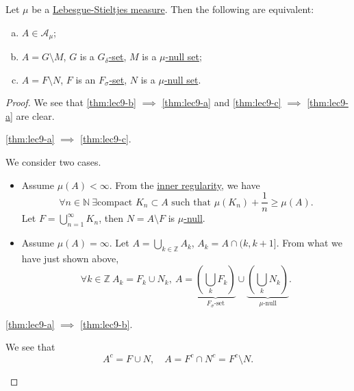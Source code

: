 \begin{theorem}\label{thm:lec9}
	Let \(\mu \) be a \hyperref[def:Lebesgue-Stieltjes-measure]{Lebesgue-Stieltjes measure}. Then the following are equivalent:
	\begin{enumerate}[(a)]
		\item\label{thm:lec9-a} \(A\in \mathcal{A} _\mu \);
		\item\label{thm:lec9-b} \(A = G\setminus M\), \(G\) is a \hyperref[def:G-delta-set]{\(G_{\delta}\)-set}, \(M\) is a \hyperref[def:mu-null-set]{\(\mu\)-null set};
		\item\label{thm:lec9-c} \(A = F\setminus N\), \(F\) is an \hyperref[def:F-sigma-set]{\(F_{\sigma}\)-set}, \(N\) is a \hyperref[def:mu-null-set]{\(\mu\)-null set}.
	\end{enumerate}
\end{theorem}
\begin{proof}
	We see that \autoref{thm:lec9-b} \(\implies \) \autoref{thm:lec9-a} and \autoref{thm:lec9-c} \(\implies \) \autoref{thm:lec9-a} are clear.
	\begin{claim}
		\autoref{thm:lec9-a} \(\implies \) \autoref{thm:lec9-c}.
	\end{claim}
	\begin{explanation}
		We consider two cases.
		\begin{itemize}
			\item Assume \(\mu (A)<\infty \). From the \hyperref[thm:inner-regularity]{inner regularity}, we have
			      \[
				      \forall n\in\mathbb{N} \ \exists \text{compact }K_{n}\subset A\text{ such that } \mu (K_{n}) + \frac{1}{n} \geq \mu (A).
			      \]
			      Let \(F = \bigcup_{n=1}^{\infty} K_{n}\), then \(N = A\setminus F\) is \hyperref[def:mu-null-set]{\(\mu\)-null}.
			\item Assume \(\mu (A) = \infty \). Let \(A = \bigcup_{k\in\mathbb{Z} } A_{k}\), \(A_{k} = A\cap (k, k+1]\). From what we
			      have just shown above,
			      \[
				      \forall k\in\mathbb{Z}\ A_{k} = F_{k}\cup N_{k},\ A = \underbrace{\left(\bigcup_{k}F_{k} \right)}_{\hyperref[def:F-sigma-set]{F_{\sigma}\text{-set}}}\cup \underbrace{\left(\bigcup_{k}N_{k}\right)}_{\hyperref[def:mu-null-set]{\mu\text{-null}}}.
			      \]
		\end{itemize}
	\end{explanation}

	\begin{claim}
		\autoref{thm:lec9-a} \(\implies \) \autoref{thm:lec9-b}.
	\end{claim}
	\begin{explanation}
		We see that
		\[
			A^{c} = F\cup N,\quad A = F^{c} \cap N^{c} = F^{c} \setminus N.
		\]
	\end{explanation}
\end{proof}

